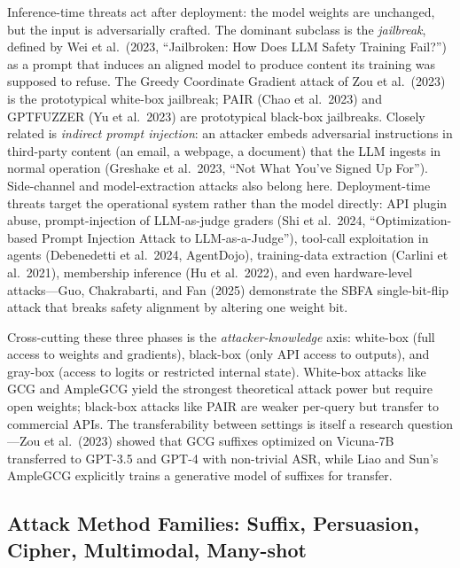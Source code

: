 \documentclass{article}
\begin{document}
Inference-time threats act after deployment: the model weights are unchanged, but the input is adversarially crafted. The dominant subclass is the \emph{jailbreak}, defined by Wei et al.~(2023, ``Jailbroken: How Does LLM Safety Training Fail?'') as a prompt that induces an aligned model to produce content its training was supposed to refuse. The Greedy Coordinate Gradient attack of Zou et al.~(2023) is the prototypical white-box jailbreak; PAIR (Chao et al.~2023) and GPTFUZZER (Yu et al.~2023) are prototypical black-box jailbreaks. Closely related is \emph{indirect prompt injection}: an attacker embeds adversarial instructions in third-party content (an email, a webpage, a document) that the LLM ingests in normal operation (Greshake et al.~2023, ``Not What You've Signed Up For''). Side-channel and model-extraction attacks also belong here. Deployment-time threats target the operational system rather than the model directly: API plugin abuse, prompt-injection of LLM-as-judge graders (Shi et al.~2024, ``Optimization-based Prompt Injection Attack to LLM-as-a-Judge''), tool-call exploitation in agents (Debenedetti et al.~2024, AgentDojo), training-data extraction (Carlini et al.~2021), membership inference (Hu et al.~2022), and even hardware-level attacks---Guo, Chakrabarti, and Fan (2025) demonstrate the SBFA single-bit-flip attack that breaks safety alignment by altering one weight bit.

Cross-cutting these three phases is the \emph{attacker-knowledge} axis: white-box (full access to weights and gradients), black-box (only API access to outputs), and gray-box (access to logits or restricted internal state). White-box attacks like GCG and AmpleGCG \citep{liao2024arxiv2404079212024} yield the strongest theoretical attack power but require open weights; black-box attacks like PAIR are weaker per-query but transfer to commercial APIs. The transferability between settings is itself a research question---Zou et al.~(2023) showed that GCG suffixes optimized on Vicuna-7B transferred to GPT-3.5 and GPT-4 with non-trivial ASR, while Liao and Sun's AmpleGCG explicitly trains a generative model of suffixes for transfer.

\subsection{Attack Method Families: Suffix, Persuasion, Cipher, Multimodal, Many-shot}\label{attack-method-families-suffix-persuasion-cipher-multimodal-many-shot}
\end{document}
